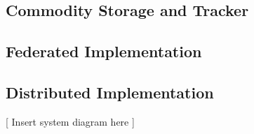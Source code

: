 \subsection{Commodity Storage and Tracker}

\subsection{Federated Implementation}

\subsection{Distributed Implementation}

[ Insert system diagram here ]






